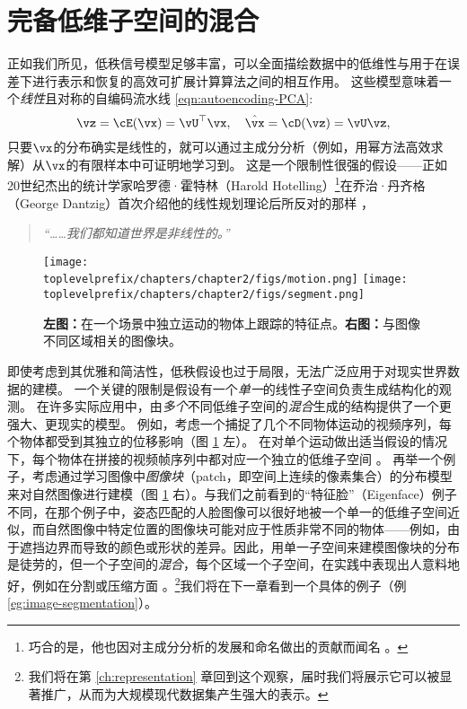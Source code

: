 \documentclass[../../book-main.tex]{subfiles}
\begin{document}
\section{完备低维子空间的混合}%
\label{sec:ica}
正如我们所见，低秩信号模型足够丰富，可以全面描绘数据中的低维性与用于在误差下进行表示和恢复的高效可扩展计算算法之间的相互作用。
这些模型意味着一个\textit{线性}且对称的自编码流水线 \eqref{eqn:autoencoding-PCA}: 
\begin{equation*}
    \vz = \cE(\vx) = \vU^\top \vx, \quad \hat{\vx} = \cD(\vz) = \vU \vz,
\end{equation*}
只要$\vx$的分布确实是线性的，就可以通过主成分分析（例如，用幂方法高效求解）从$\vx$的有限样本中可证明地学习到。
这是一个限制性很强的假设——正如20世纪杰出的统计学家哈罗德·霍特林（Harold Hotelling）\footnote{巧合的是，他也因对主成分分析的发展和命名做出的贡献而闻名 \cite{Hotelling1933}。}在乔治·丹齐格（George Dantzig）首次介绍他的线性规划理论后所反对的那样 \cite{Dantzig2002-eh}，
\begin{quote}
\centering
    \textit{“……我们都知道世界是非线性的。”}
\end{quote}


\begin{figure}
    \centering
    \texttt{[image: \\toplevelprefix/chapters/chapter2/figs/motion.png]} \hspace{5mm}
    \texttt{[image: \\toplevelprefix/chapters/chapter2/figs/segment.png]} 
    \caption{\textbf{左图：}在一个场景中独立运动的物体上跟踪的特征点。\textbf{右图：}与图像不同区域相关的图像块。}
    \label{fig:multiple-subspaces}
\end{figure}
即使考虑到其优雅和简洁性，低秩假设也过于局限，无法广泛应用于对现实世界数据的建模。
一个关键的限制是假设有一个\textit{单一}的线性子空间负责生成结构化的观测。
在许多实际应用中，由\textit{多个}不同低维子空间的\textit{混合}生成的结构提供了一个更强大、更现实的模型。
例如，考虑一个捕捉了几个不同物体运动的视频序列，每个物体都受到其独立的位移影响（图 \ref{fig:multiple-subspaces} 左）。
在对单个运动做出适当假设的情况下，每个物体在拼接的视频帧序列中都对应一个独立的低维子空间 \cite{VidalR2004-ECCV}。
再举一个例子，考虑通过学习图像中\textit{图像块}（patch，即空间上连续的像素集合）的分布模型来对自然图像进行建模（图 \ref{fig:multiple-subspaces} 右）。与我们之前看到的“特征脸”（Eigenface）例子不同，在那个例子中，姿态匹配的人脸图像可以很好地被一个单一的低维子空间近似，而自然图像中特定位置的图像块可能对应于性质非常不同的物体——例如，由于遮挡边界而导致的颜色或形状的差异。因此，用单一子空间来建模图像块的分布是徒劳的，但一个子空间的\textit{混合}，每个区域一个子空间，在实践中表现出人意料地好，例如在分割或压缩方面 \cite{Mobahi-IJCV2011}。\footnote{我们将在第 \ref{ch:representation} 章回到这个观察，届时我们将展示它可以被显著推广，从而为大规模现代数据集产生强大的表示。}我们将在下一章看到一个具体的例子（例 \ref{eg:image-segmentation}）。
\end{document}

